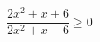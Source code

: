 \begin{ex}[type=inequality]
	\begin{condition}
		\( \dfrac{2x^2+x+6}{2x^2+x-6}\ge0 \)
	\end{condition}
\end{ex}